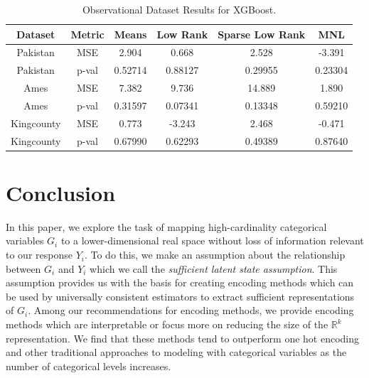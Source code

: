 \documentclass{article}
\theoremstyle{plain}
\theoremstyle{definition}
\theoremstyle{remark}
\begin{document}




\begin{table}[H]
	\centering
	\begin{tabular}{|c|c|c|c|c|c|}
		\hline
		Dataset& Metric & Means & Low Rank & Sparse Low Rank & MNL  \\
		\hline
		Pakistan & MSE & 2.904 &0.668 & 2.528&-3.391\\
		Pakistan & p-val&0.52714  &0.88127 &0.29955 &0.23304 \\
		\hline
		Ames & MSE & 7.382 & 9.736& 14.889& 1.890\\
		Ames & p-val& 0.31597&0.07341 & 0.13348& 0.59210\\
		\hline
		Kingcounty & MSE & 0.773& -3.243&2.468 & -0.471\\
		Kingcounty & p-val&0.67990&0.62293&0.49389& 0.87640\\
		\hline
	\end{tabular}
	\caption{Observational Dataset Results for XGBoost.}
	\label{tab:observational}
\end{table}



\section{Conclusion}

In this paper, we explore the task of mapping high-cardinality categorical variables $G_i$ to a lower-dimensional real space without loss of information relevant to our response $Y_i$. To do this, we make an assumption about the relationship between $G_i$ and $Y_i$ which we call the \textit{sufficient latent state assumption}. This assumption provides us with the basis for creating encoding methods which can be used by universally consistent estimators to extract sufficient representations of $G_i$. Among our recommendations for encoding methods, we provide encoding methods which are interpretable or focus more on reducing the size of the  $\mathbb{R}^k$ representation. We find that these methods tend to outperform one hot encoding and other traditional approaches to modeling with categorical variables as the number of categorical levels increases.
\end{document}
